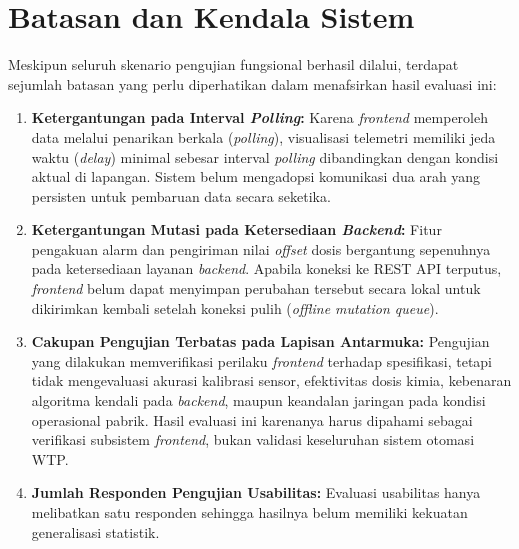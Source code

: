 \section{Batasan dan Kendala Sistem}
Meskipun seluruh skenario pengujian fungsional berhasil dilalui, terdapat sejumlah batasan yang perlu diperhatikan 
dalam menafsirkan hasil evaluasi ini:
\begin{enumerate}
    \item \textbf{Ketergantungan pada Interval \textit{Polling}:} Karena \textit{frontend} memperoleh data melalui 
    penarikan berkala (\textit{polling}), visualisasi telemetri memiliki jeda waktu (\textit{delay}) minimal sebesar 
    interval \textit{polling} dibandingkan dengan kondisi aktual di lapangan. Sistem belum mengadopsi komunikasi dua arah 
    yang persisten untuk pembaruan data secara seketika.
    \item \textbf{Ketergantungan Mutasi pada Ketersediaan \textit{Backend}:} Fitur pengakuan alarm dan pengiriman nilai 
    \textit{offset} dosis bergantung sepenuhnya pada ketersediaan layanan \textit{backend}. Apabila koneksi ke REST API 
    terputus, \textit{frontend} belum dapat menyimpan perubahan tersebut secara lokal untuk dikirimkan kembali setelah 
    koneksi pulih (\textit{offline mutation queue}).
    \item \textbf{Cakupan Pengujian Terbatas pada Lapisan Antarmuka:} Pengujian yang dilakukan memverifikasi perilaku 
    \textit{frontend} terhadap spesifikasi, tetapi tidak mengevaluasi akurasi kalibrasi sensor, efektivitas dosis kimia, 
    kebenaran algoritma kendali pada \textit{backend}, maupun keandalan jaringan pada kondisi operasional pabrik. 
    Hasil evaluasi ini karenanya harus dipahami sebagai verifikasi subsistem \textit{frontend}, bukan validasi keseluruhan 
    sistem otomasi WTP.
    \item \textbf{Jumlah Responden Pengujian Usabilitas:} Evaluasi usabilitas hanya melibatkan satu responden sehingga 
    hasilnya belum memiliki kekuatan generalisasi statistik.
\end{enumerate}